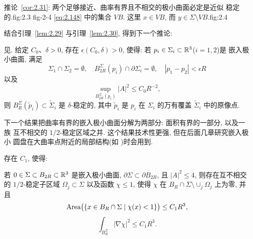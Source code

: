  {推论~\ref{cor:2.31}: 两个足够接近、曲率有界且不相交的极小曲面必定是近似
  稳定的.}{fig:2.3}
 {fig-2-4}
 {\eqref{eq:2.148} 中的集合 $VB$. 这里 $x\in VB$, 而 $y\in\Sigma\setminus VB$.}{fig:2.4}

结合引理~\ref{lem:2.29} 与引理~\ref{lem:2.30}, 得到下一个推论:

\begin{corollary}
\label{cor:2.31}
见. 给定 $C_0$、$\delta>0$, 存在
$\epsilon(C_0,\delta)>0$, 使得: 若 $p_i\in\Sigma_i\subset\mathbb{R}^3$($i=1,2$)是
嵌入极小曲面, 满足
\[
\Sigma_1\cap\Sigma_2=\emptyset,\quad
B_{2R}^{\Sigma}(p_i)\cap\partial\Sigma_i=\emptyset,\quad
|p_1-p_2|<\epsilon R
\]
以及
\begin{equation}
\sup_{B_{2R}^{\Sigma}(p_i)}|A|^{2}\leq C_0R^{-2},
\label{eq:2.144}
\end{equation}
则 $B_R^{\Sigma}(\tilde p_i)\subset\tilde\Sigma_i$ 是 $\delta$-稳定的, 其中
$\tilde p_i$ 是 $p_i$ 在 $\Sigma_i$ 的万有覆盖 $\tilde\Sigma_i$ 中的原像点.
\end{corollary}

下一个结果把曲率有界的嵌入极小曲面分解为两部分: 面积有界的一部分, 以及一族
互不相交的 $1/2$-稳定区域之并. 这个结果技术性更强, 但在后面几章研究嵌入极小
圆盘在大曲率点附近的局部结构(如 \cite{CM4})时会用到.

\begin{lemma}
\label{lem:2.32}
存在 $C_1$, 使得:

若 $0\in\Sigma\subset B_{2R}\subset\mathbb{R}^3$ 是嵌入极小曲面,
$\partial\Sigma\subset\partial B_{2R}$, 且 $|A|^{2}\leq4$, 则存在互不相交的
$1/2$-稳定子区域 $\Omega_j\subset\Sigma$ 以及函数 $\chi\leq1$, 使得 $\chi$ 在
$B_R\cap\Sigma\setminus\cup_j\Omega_j$ 上为零, 并且
\begin{equation}
\operatorname{Area}\bigl(\{x\in B_R\cap\Sigma\mid\chi(x)<1\}\bigr)\leq C_1R^{3},
\label{eq:2.145}
\end{equation}
\begin{equation}
\int_{B_R^{\Sigma}}|\nabla\chi|^{2}\leq C_1R^{3}.
\label{eq:2.146}
\end{equation}
\end{lemma}

